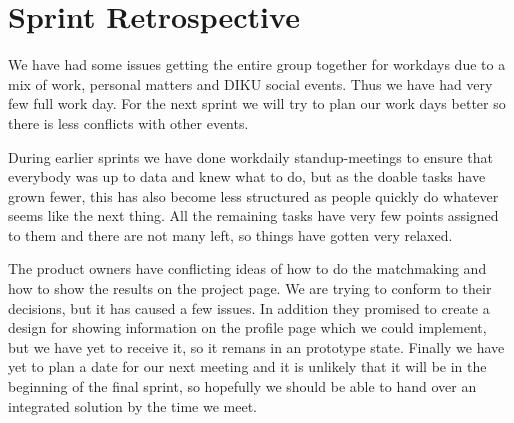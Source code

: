\section{Sprint Retrospective}

We have had some issues getting the entire group together for workdays due to a
mix of work, personal matters and DIKU social events. Thus we have had very few
full work day. For the next sprint we will try to plan our work days better so
there is less conflicts with other events.

During earlier sprints we have done workdaily standup-meetings to ensure that
everybody was up to data and knew what to do, but as the doable tasks have grown
fewer, this has also become less structured as people quickly do whatever seems
like the next thing. All the remaining tasks have very few points assigned to
them and there are not many left, so things have gotten very relaxed.

The product owners have conflicting ideas of how to do the matchmaking and how
to show the results on the project page. We are trying to conform to their
decisions, but it has caused a few issues. In addition they promised to create a
design for showing information on the profile page which we could implement, but
we have yet to receive it, so it remans in an prototype state. Finally we have
yet to plan a date for our next meeting and it is unlikely that it will be in
the beginning of the final sprint, so hopefully we should be able to hand over
an integrated solution by the time we meet.